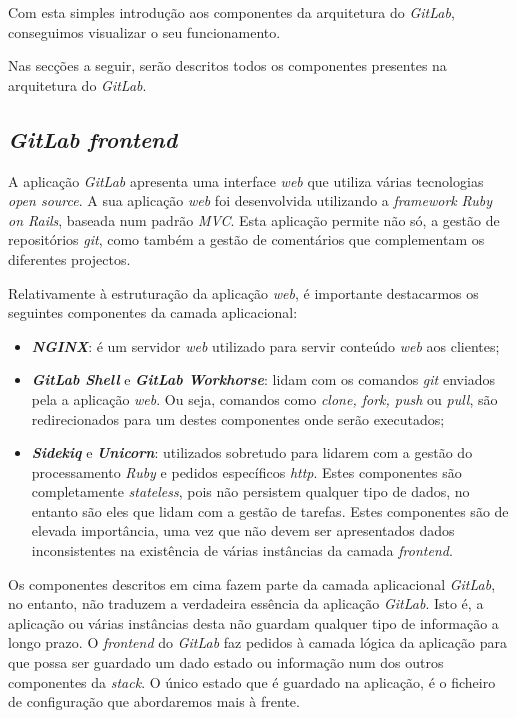 \documentclass[12pt,a4paper]{article}
\begin{document}
Com esta simples introdução aos componentes da arquitetura do \emph{GitLab}, conseguimos visualizar o seu funcionamento.

Nas secções a seguir, serão descritos todos os componentes presentes na arquitetura do \emph{GitLab}.


\subsection{\emph{GitLab frontend}}

A aplicação \emph{GitLab} apresenta uma interface \emph{web} que utiliza várias tecnologias \emph{open source}. A sua aplicação \emph{web} foi desenvolvida utilizando a \emph{framework} \emph{Ruby on Rails}, baseada num padrão \emph{MVC}. Esta aplicação permite não só, a gestão de repositórios \emph{git}, como também a gestão de comentários que complementam os diferentes projectos.

Relativamente à estruturação da aplicação \emph{web}, é importante destacarmos os seguintes componentes da camada aplicacional:

\begin{itemize}
    \item \emph{\textbf{NGINX}}: é um servidor \emph{web} utilizado para servir conteúdo \emph{web} aos clientes;
    \item \emph{\textbf{GitLab Shell}} e \emph{\textbf{GitLab Workhorse}}: lidam com os comandos \emph{git} enviados pela a aplicação \emph{web}. Ou seja, comandos como \emph{clone, fork, push} ou \emph{pull}, são redirecionados para um destes componentes onde serão executados;
    \item \emph{\textbf{Sidekiq}} e \emph{\textbf{Unicorn}}: utilizados sobretudo para lidarem com a gestão do processamento \emph{Ruby} e pedidos específicos \emph{http}. Estes componentes são completamente \emph{stateless}, pois não persistem qualquer tipo de dados, no entanto são eles que lidam com a gestão de tarefas. Estes componentes são de elevada importância, uma vez que não devem ser apresentados dados inconsistentes na existência de várias instâncias da camada \emph{frontend}.
\end{itemize}

Os componentes descritos em cima fazem parte da camada aplicacional \emph{GitLab}, no entanto, não traduzem a verdadeira essência da aplicação \emph{GitLab}. Isto é, a aplicação ou várias instâncias desta não guardam qualquer tipo de informação a longo prazo. O \emph{frontend} do \emph{GitLab} faz pedidos à camada lógica da aplicação para que possa ser guardado um dado estado ou informação num dos outros componentes da \emph{stack}. O único estado que é guardado na aplicação, é o ficheiro de configuração que abordaremos mais à frente.
\end{document}
